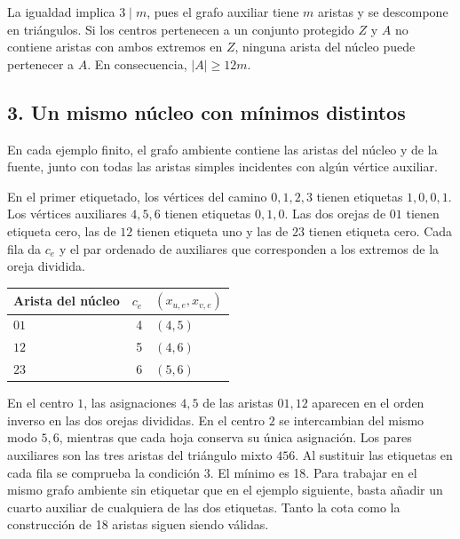 \documentclass[spanish,11pt,a4paper]{article}
\newcounter{none}
\begin{document}
La igualdad implica \(3\mid m\), pues el grafo auxiliar tiene \(m\) aristas y se descompone en triángulos. Si los centros pertenecen a un conjunto protegido \(Z\) y \(A\) no contiene aristas con ambos extremos en \(Z\), ninguna arista del núcleo puede pertenecer a \(A\). En consecuencia, \(|A|\ge12m\).

\subsection{3. Un mismo núcleo con mínimos distintos}\label{un-mismo-nuxfacleo-con-muxednimos-distintos}

En cada ejemplo finito, el grafo ambiente contiene las aristas del núcleo y de la fuente, junto con todas las aristas simples incidentes con algún vértice auxiliar.

En el primer etiquetado, los vértices del camino \(0,1,2,3\) tienen etiquetas \(1,0,0,1\). Los vértices auxiliares \(4,5,6\) tienen etiquetas \(0,1,0\). Las dos orejas de \(01\) tienen etiqueta cero, las de \(12\) tienen etiqueta uno y las de \(23\) tienen etiqueta cero. Cada fila da \(c_e\) y el par ordenado de auxiliares que corresponden a los extremos de la oreja dividida.

{\def\LTcaptype{none} %
\begin{longtable}[]{@{}lrl@{}}
\toprule\noalign{}
Arista del núcleo & \(c_e\) & \((x_{u,e},x_{v,e})\) \\
\midrule\noalign{}
\endhead
\bottomrule\noalign{}
\endlastfoot
\(01\) & 4 & \((4,5)\) \\
\(12\) & 5 & \((4,6)\) \\
\(23\) & 6 & \((5,6)\) \\
\end{longtable}
}

En el centro \(1\), las asignaciones \(4,5\) de las aristas \(01,12\) aparecen en el orden inverso en las dos orejas divididas. En el centro \(2\) se intercambian del mismo modo \(5,6\), mientras que cada hoja conserva su única asignación. Los pares auxiliares son las tres aristas del triángulo mixto \(456\). Al sustituir las etiquetas en cada fila se comprueba la condición 3. El mínimo es 18. Para trabajar en el mismo grafo ambiente sin etiquetar que en el ejemplo siguiente, basta añadir un cuarto auxiliar de cualquiera de las dos etiquetas. Tanto la cota como la construcción de 18 aristas siguen siendo válidas.
\end{document}
